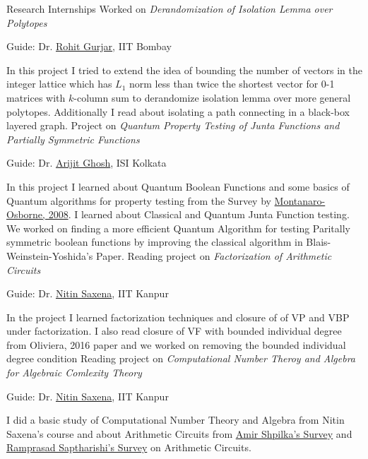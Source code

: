 \begin{rubric}{Research Internships}
\entry*[Summer 2024]%
	Worked on \textit{Derandomization of Isolation Lemma over Polytopes}

    Guide: Dr. \href{https://www.cse.iitb.ac.in/~rgurjar/}{Rohit Gurjar}, IIT Bombay

    In this project I tried to extend the idea of bounding the number of vectors in the integer lattice which has $L_1$ norm less than twice the shortest vector for 0-1 matrices with $k$-column sum to derandomize isolation lemma over more general polytopes. Additionally I read about isolating a path connecting in a black-box layered graph.
%
%
%
	Project on \textit{Quantum Property Testing of Junta Functions and Partially Symmetric Functions}

    Guide: Dr. \href{https://sites.google.com/site/homepagearijitghosh/}{Arijit Ghosh}, ISI Kolkata

    In this project I learned about Quantum Boolean Functions and some basics of Quantum algorithms for property testing from the Survey by \href{https://arxiv.org/abs/0810.2435}{Montanaro-Osborne, 2008}. I learned about Classical and Quantum Junta Function testing. We worked on finding a more efficient Quantum Algorithm for testing Paritally symmetric boolean functions by improving the classical algorithm in Blais-Weinstein-Yoshida's Paper.
%
\entry*[Summer 2023]%
	Reading project on \textit{Factorization of Arithmetic Circuits} 

    Guide: Dr. \href{https://www.cse.iitk.ac.in/users/nitin/}{Nitin Saxena}, IIT Kanpur

   In the project I learned factorization techniques and closure of of VP and VBP under factorization. I also read closure of VF with bounded individual degree from Oliviera, 2016 paper and we worked on removing the bounded individual degree condition
\entry*[Dec 2022]%
	Reading project on \textit{Computational Number Theroy and Algebra for Algebraic Comlexity Theory } 

    Guide: Dr. \href{https://www.cse.iitk.ac.in/users/nitin/}{Nitin Saxena}, IIT Kanpur

   I did a basic study of Computational Number Theory and Algebra from Nitin Saxena's course and about Arithmetic Circuits from \href{https://www.nowpublishers.com/article/Details/TCS-039}{Amir Shpilka's Survey} and \href{https://github.com/dasarpmar/lowerbounds-survey}{Ramprasad Saptharishi's Survey} on Arithmetic Circuits.
\end{rubric}
